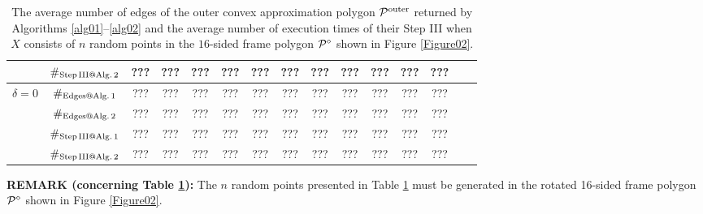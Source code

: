\documentclass[12pt]{article}
\newcommand{\red}[1]{{\color{red} #1 }}
\begin{document}
\begin{table}[ht]
\begin{center}
\begin{tabular}{|c|c||c|c|c|c|c|c|c|c|c|c|c|c|c|}
		& $\#_{\rm Step\, III @ Alg.\, 2}$& ???& ???& ???& ???& ???& ???& ???& ???& ???& ???& ???   \\
		\hline
		\multirow{ 4}{*}{ $\delta = 0$}

        & $\#_{\rm Edges@ Alg.\, 1}$  &   ???& ???& ???& ???& ???& ???& ???& ???& ???& ???& ??? \\
        
        & $\#_{\rm Edges@ Alg.\, 2}$  &   ???& ???& ???& ???& ???& ???& ???& ???& ???& ???& ??? \\
		
		& $\#_{\rm Step\, III @ Alg.\, 1}$  &   ???& ???& ???& ???& ???& ???& ???& ???& ???& ???& ??? \\
		
		& $\#_{\rm Step\, III @ Alg.\, 2}$& ???& ???& ???& ???& ???& ???& ???& ???& ???& ???& ???   \\
		\hline
	\end{tabular}
		\caption{The average number of edges of the outer convex approximation polygon ${\cal P}^{\rm outer}$ returned by Algorithms \ref{alg01}--\ref{alg02} and the average number of execution times of their Step III when $X$ consists of $n$ random points in the $16$-sided frame polygon ${\cal P}^\diamond$ shown in Figure \ref{Figure02}.}
		\label{table01}
	\end{center}
\end{table} 	



\red{
\bigskip\noindent
{\bf REMARK (concerning Table \ref{table01}):} 
The $n$ random points presented in Table \ref{table01} must be generated in the rotated 16-sided frame polygon ${\cal P}^\diamond$ shown in Figure \ref{Figure02}.

\bigskip
}
\end{document}

